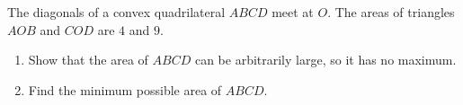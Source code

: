 The diagonals of a convex quadrilateral $ABCD$ meet at $O$. The areas of triangles $AOB$ and $COD$ are $4$ and $9$.
\begin{enumerate}
\item[(a)] Show that the area of $ABCD$ can be arbitrarily large, so it has no maximum.
\item[(b)] Find the minimum possible area of $ABCD$.
\end{enumerate}
